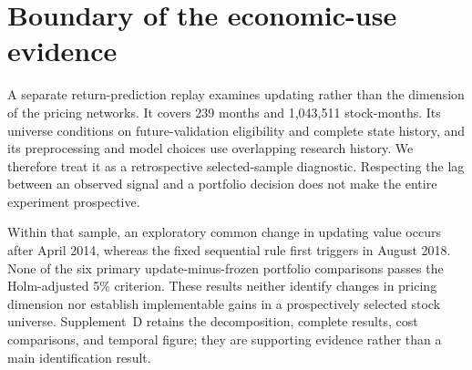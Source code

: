\section{Boundary of the economic-use evidence}

A separate return-prediction replay examines updating rather than the dimension of the pricing networks. It covers 239 months and 1,043,511 stock-months. Its universe conditions on future-validation eligibility and complete state history, and its preprocessing and model choices use overlapping research history. We therefore treat it as a retrospective selected-sample diagnostic. Respecting the lag between an observed signal and a portfolio decision does not make the entire experiment prospective.

Within that sample, an exploratory common change in updating value occurs after April 2014, whereas the fixed sequential rule first triggers in August 2018. None of the six primary update-minus-frozen portfolio comparisons passes the Holm-adjusted 5\% criterion. These results neither identify changes in pricing dimension nor establish implementable gains in a prospectively selected stock universe. Supplement~D retains the decomposition, complete results, cost comparisons, and temporal figure; they are supporting evidence rather than a main identification result.
